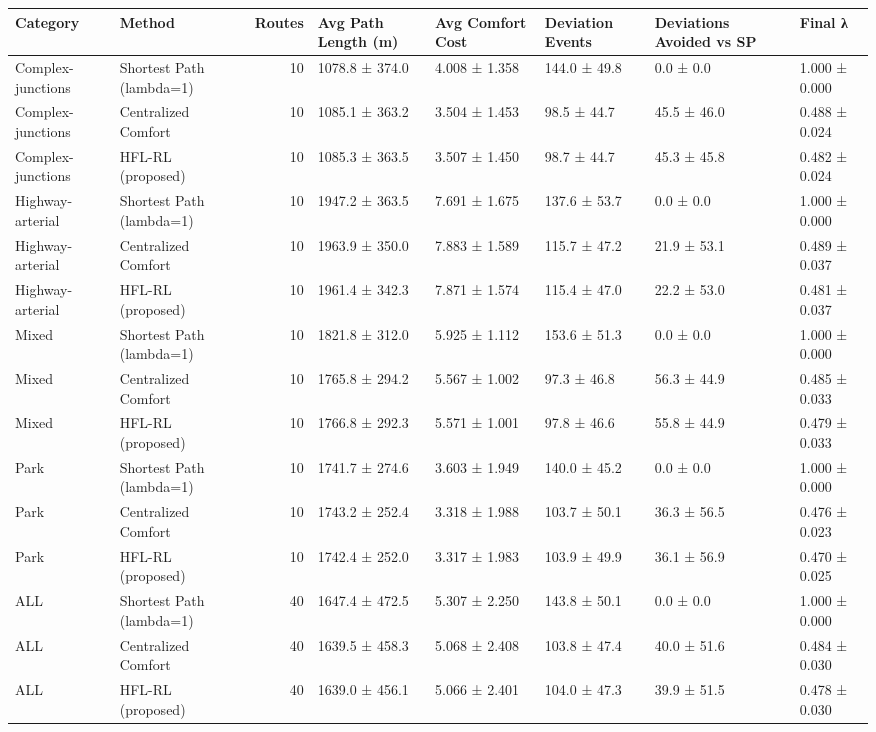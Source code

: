 \begin{tabular}{llrlllll}
\toprule
Category & Method & Routes & Avg Path Length (m) & Avg Comfort Cost & Deviation Events & Deviations Avoided vs SP & Final λ \\
\midrule
Complex-junctions & Shortest Path (lambda=1) & 10 & 1078.8 ± 374.0 & 4.008 ± 1.358 & 144.0 ± 49.8 & 0.0 ± 0.0 & 1.000 ± 0.000 \\
Complex-junctions & Centralized Comfort & 10 & 1085.1 ± 363.2 & 3.504 ± 1.453 & 98.5 ± 44.7 & 45.5 ± 46.0 & 0.488 ± 0.024 \\
Complex-junctions & HFL-RL (proposed) & 10 & 1085.3 ± 363.5 & 3.507 ± 1.450 & 98.7 ± 44.7 & 45.3 ± 45.8 & 0.482 ± 0.024 \\
Highway-arterial & Shortest Path (lambda=1) & 10 & 1947.2 ± 363.5 & 7.691 ± 1.675 & 137.6 ± 53.7 & 0.0 ± 0.0 & 1.000 ± 0.000 \\
Highway-arterial & Centralized Comfort & 10 & 1963.9 ± 350.0 & 7.883 ± 1.589 & 115.7 ± 47.2 & 21.9 ± 53.1 & 0.489 ± 0.037 \\
Highway-arterial & HFL-RL (proposed) & 10 & 1961.4 ± 342.3 & 7.871 ± 1.574 & 115.4 ± 47.0 & 22.2 ± 53.0 & 0.481 ± 0.037 \\
Mixed & Shortest Path (lambda=1) & 10 & 1821.8 ± 312.0 & 5.925 ± 1.112 & 153.6 ± 51.3 & 0.0 ± 0.0 & 1.000 ± 0.000 \\
Mixed & Centralized Comfort & 10 & 1765.8 ± 294.2 & 5.567 ± 1.002 & 97.3 ± 46.8 & 56.3 ± 44.9 & 0.485 ± 0.033 \\
Mixed & HFL-RL (proposed) & 10 & 1766.8 ± 292.3 & 5.571 ± 1.001 & 97.8 ± 46.6 & 55.8 ± 44.9 & 0.479 ± 0.033 \\
Park & Shortest Path (lambda=1) & 10 & 1741.7 ± 274.6 & 3.603 ± 1.949 & 140.0 ± 45.2 & 0.0 ± 0.0 & 1.000 ± 0.000 \\
Park & Centralized Comfort & 10 & 1743.2 ± 252.4 & 3.318 ± 1.988 & 103.7 ± 50.1 & 36.3 ± 56.5 & 0.476 ± 0.023 \\
Park & HFL-RL (proposed) & 10 & 1742.4 ± 252.0 & 3.317 ± 1.983 & 103.9 ± 49.9 & 36.1 ± 56.9 & 0.470 ± 0.025 \\
ALL & Shortest Path (lambda=1) & 40 & 1647.4 ± 472.5 & 5.307 ± 2.250 & 143.8 ± 50.1 & 0.0 ± 0.0 & 1.000 ± 0.000 \\
ALL & Centralized Comfort & 40 & 1639.5 ± 458.3 & 5.068 ± 2.408 & 103.8 ± 47.4 & 40.0 ± 51.6 & 0.484 ± 0.030 \\
ALL & HFL-RL (proposed) & 40 & 1639.0 ± 456.1 & 5.066 ± 2.401 & 104.0 ± 47.3 & 39.9 ± 51.5 & 0.478 ± 0.030 \\
\bottomrule
\end{tabular}
